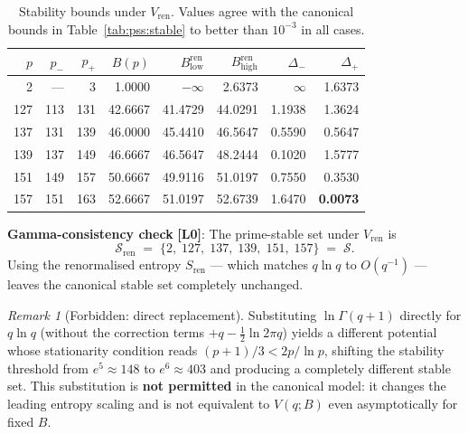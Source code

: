 \documentclass[12pt,a4paper]{article}
\theoremstyle{definition}
\theoremstyle{remark}
\newtheorem{remark}[theorem]{Remark}
\newcommand{\Lzero}{\textbf{[L0]}}
\begin{document}
\begin{table}[h]
\centering
\caption{Stability bounds under $V_{\mathrm{ren}}$.  Values agree with the
         canonical bounds in Table~\ref{tab:pss:stable} to better than
         $10^{-3}$ in all cases.}
\label{tab:pss:gamma:stable}
\begin{tabular}{rrrrrrrr}
\toprule
$p$ & $p_-$ & $p_+$ & $B(p)$ & $B^{\mathrm{ren}}_{\mathrm{low}}$ & $B^{\mathrm{ren}}_{\mathrm{high}}$
    & $\Delta_-$ & $\Delta_+$ \\
\midrule
  2 & ---   &   3 &   1.0000 & $-\infty$ &   2.6373 & $\infty$ & 1.6373 \\
127 & 113   & 131 &  42.6667 &   41.4729 &   44.0291 & 1.1938   & 1.3624 \\
137 & 131   & 139 &  46.0000 &   45.4410 &   46.5647 & 0.5590   & 0.5647 \\
139 & 137   & 149 &  46.6667 &   46.5647 &   48.2444 & 0.1020   & 1.5777 \\
151 & 149   & 157 &  50.6667 &   49.9116 &   51.0197 & 0.7550   & 0.3530 \\
157 & 151   & 163 &  52.6667 &   51.0197 &   52.6739 & 1.6470   & \textbf{0.0073} \\
\bottomrule
\end{tabular}
\end{table}

\begin{resultbox}
\textbf{Gamma-consistency check} \Lzero{}:
The prime-stable set under $V_{\mathrm{ren}}$ is
\[
  \mathcal{S}_{\mathrm{ren}} \;=\; \{2,\;127,\;137,\;139,\;151,\;157\}
  \;=\; \mathcal{S}.
\]
Using the renormalised entropy $S_{\mathrm{ren}}$ — which matches $q\ln q$ to
$O(q^{-1})$ — leaves the canonical stable set completely unchanged.
\end{resultbox}

\begin{remark}[Forbidden: direct replacement]
\label{rem:pss:gamma:forbidden}
Substituting $\ln\Gamma(q+1)$ directly for $q\ln q$ (without the
correction terms $+q - \frac{1}{2}\ln 2\pi q$) yields a different potential
whose stationarity condition reads $(p+1)/3 < 2p/\ln p$, shifting the
stability threshold from $e^5 \approx 148$ to $e^6 \approx 403$ and producing
a completely different stable set.  This substitution is \textbf{not permitted}
in the canonical model: it changes the leading entropy scaling and is not
equivalent to $V(q;B)$ even asymptotically for fixed $B$.
\end{remark}
\end{document}
